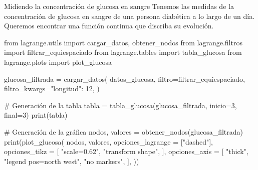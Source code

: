 \begin{frame}[fragile]{Midiendo la concentración de glucosa en sangre}
  Tenemos las medidas de la concentración de glucosa en sangre de una
  persona diabética a lo largo de un día. Queremos encontrar una
  \alert{función continua} que discriba su evolución.
  
  \begin{multicols}{2}
    \begin{pycode}[glucosa]
      from lagrange.utils import cargar_datos, obtener_nodos
      from lagrange.filtros import filtrar_equiespaciado
      from lagrange.tables import tabla_glucosa
      from lagrange.plots import plot_glucosa

      glucosa_filtrada = cargar_datos(
        datos_glucosa,
        filtro=filtrar_equiespaciado,
        filtro_kwargs={"longitud": 12},
      )
    \end{pycode}

    \begin{pycode}[glucosa]
      # Generación de la tabla
      tabla = tabla_glucosa(glucosa_filtrada, inicio=3, final=3)
      print(tabla)
    \end{pycode}

    \columnbreak

    \begin{pycode}[glucosa]
      # Generación de la gráfica
      nodos, valores = obtener_nodos(glucosa_filtrada)
      print(plot_glucosa(
        nodos,
        valores,
        opciones_lagrange = ["dashed"],
        opciones_tikz = [
          "scale=0.62",
          "transform shape",
        ],
        opciones_axis = [
          "thick",
          "legend pos=north west",
          "no markers",
        ],
      ))
    \end{pycode}
  \end{multicols}
\end{frame}
